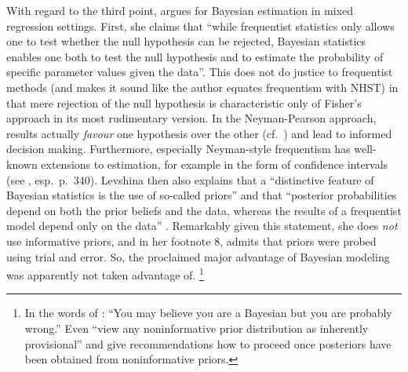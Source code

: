 With regard to the third point, \citet[251--252]{Levshina2016} argues for Bayesian estimation in mixed regression settings.
First, she claims that ``while frequentist statistics only allows one to test whether the null hypothesis can be rejected, Bayesian statistics enables one both to test the null hypothesis and to estimate the probability of specific parameter values given the data''.
This does not do justice to frequentist methods (and makes it sound like the author equates frequentism with NHST) in that mere rejection of the null hypothesis is characteristic only of Fisher's approach in its most rudimentary version.
In the Neyman-Pearson approach, results actually \textit{favour} one hypothesis over the other (cf.\ \citealt{Lehmann1993,Lehmann2011,Perezgonzalez2015}) and lead to informed decision making.
Furthermore, especially Neyman-style frequentism has well-known extensions to estimation, for example in the form of confidence intervals (see \citealt{GreenlandEa2016}, esp.\ p.\ 340).
Levshina then also explains that a ``distinctive feature of Bayesian statistics is the use of so-called priors'' and that ``posterior probabilities depend on both the prior beliefs and the data, whereas the results of a frequentist model depend only on the data'' \citep[252]{Levshina2016}.
Remarkably given this statement, she does \textit{not} use informative priors, and in her footnote 8, \citet[252]{Levshina2016} admits that priors were probed using trial and error.
So, the proclaimed major advantage of Bayesian modeling was apparently not taken advantage of.%
\footnote{In the words of \citet{Senn2011}: ``You may believe you are a Bayesian but you are probably wrong.''
Even \citet[347--348]{GelmanHill2006} ``view any noninformative prior distribution as inherently provisional'' and give recommendations how to proceed once posteriors have been obtained from noninformative priors.}

